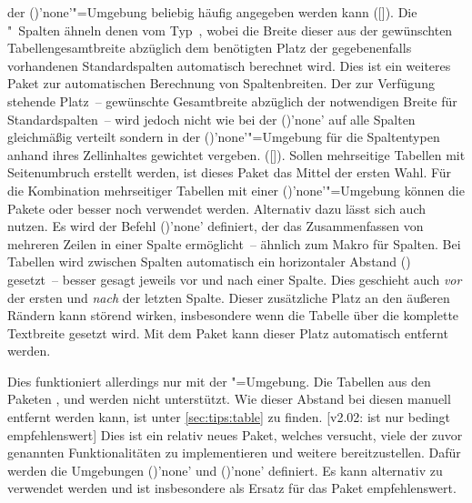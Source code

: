 \begin{DeclarePackages}[Tabellen|?]
  der ()'none'"=Umgebung beliebig 
  häufig angegeben werden kann 
  ([]). 
  Die "~Spalten ähneln denen vom Typ~, 
  wobei die Breite dieser aus der gewünschten Tabellengesamtbreite abzüglich 
  dem benötigten Platz der gegebenenfalls vorhandenen Standardspalten 
  automatisch berechnet wird.
  Dies ist ein weiteres Paket zur automatischen Berechnung von Spaltenbreiten. 
  Der zur Verfügung stehende Platz~-- gewünschte Gesamtbreite abzüglich der 
  notwendigen Breite für Standardspalten~-- wird jedoch nicht wie bei der 
  ()'none' auf alle Spalten 
  gleichmäßig verteilt sondern in der 
  ()'none'"=Umgebung für die 
  Spaltentypen~ anhand ihres Zellinhaltes gewichtet vergeben. 
  ([]). 
  Sollen mehrseitige Tabellen mit Seitenumbruch erstellt werden, ist dieses 
  Paket das Mittel der ersten Wahl. Für die Kombination mehrseitiger Tabellen 
  mit einer ()'none'"=Umgebung können 
  die Pakete  oder besser noch  verwendet 
  werden. Alternativ dazu lässt sich auch  nutzen.
  Es wird der Befehl ()'none' definiert, der 
  das Zusammenfassen von mehreren Zeilen in einer Spalte ermöglicht~-- ähnlich 
  zum Makro  für Spalten.
  Bei Tabellen wird zwischen Spalten automatisch ein horizontaler Abstand 
  () gesetzt~-- besser gesagt jeweils vor und nach einer 
  Spalte. Dies geschieht auch \emph{vor} der ersten und \emph{nach} der letzten 
  Spalte. Dieser zusätzliche Platz an den äußeren Rändern kann störend wirken, 
  insbesondere wenn die Tabelle über die komplette Textbreite gesetzt wird. Mit 
  dem Paket  kann dieser Platz automatisch entfernt 
  werden.
  
  Dies funktioniert allerdings nur mit der "=Umgebung. 
  Die Tabellen aus den Paketen ,  und 
   werden nicht unterstützt. Wie dieser Abstand bei diesen 
  manuell entfernt werden kann, ist unter \autoref{sec:tips:table} zu finden.
[v2.02: ist nur bedingt empfehlenswert]
  Dies ist ein relativ neues Paket, welches versucht, viele der zuvor genannten 
  Funktionalitäten zu implementieren und weitere bereitzustellen. Dafür werden 
  die Umgebungen ()'none' und 
  ()'none' definiert. Es 
  kann alternativ zu  verwendet werden und ist insbesondere 
  als Ersatz für das Paket  empfehlenswert.
  

\end{DeclarePackages}
